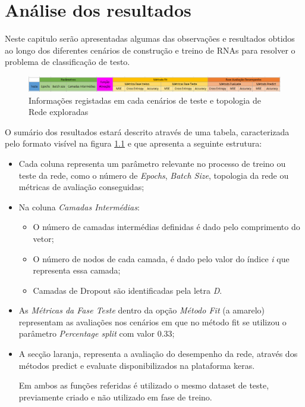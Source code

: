 \chapter{Análise dos resultados}
\label{cht:analiseresultados}

Neste capitulo serão apresentadas algumas das observações e resultados obtidos ao longo dos diferentes cenários de construção e treino de RNAs para resolver o problema de classificação de testo. 

\begin{figure}[H]
    \hspace{-0.6in}
    \includegraphics[scale=0.7]{Imagens/tabela.png}
    \caption{Informações registadas em cada cenários de teste e topologia de Rede exploradas}
    \label{fig:Tabela}
\end{figure}

O sumário dos resultados estará descrito através de uma tabela, caracterizada pelo formato visível na figura \ref{fig:Tabela} e que apresenta a seguinte estrutura:
\begin{itemize}[noitemsep]
    \item Cada coluna representa um parâmetro relevante no processo de treino ou teste da rede, como o número de \textit{Epochs}, \textit{Batch Size}, topologia da rede ou métricas de avaliação conseguidas; 

    \item Na coluna \textit{Camadas Intermédias}:
    \begin{itemize}[noitemsep]
        \item O número de camadas intermédias definidas é dado pelo comprimento do vetor;
        
        \item O número de nodos de cada camada, é dado pelo valor do índice \textit{i} que representa essa camada;
        
        \item Camadas de Dropout são identificadas pela letra \textit{D}. 
    \end{itemize}
    
    \item As \textit{Métricas da Fase Teste} dentro da opção \textit{Método Fit} (a amarelo) representam as avaliações nos cenários em que no método fit se utilizou o parâmetro \textit{Percentage split} com valor 0.33;
    
    \item A secção laranja, representa a avaliação do desempenho da rede, através dos métodos predict e evaluate disponibilizados na plataforma keras. 
    
    Em ambos as funções referidas é utilizado o mesmo dataset de teste, previamente criado e não utilizado em fase de treino. 
\end{itemize}

